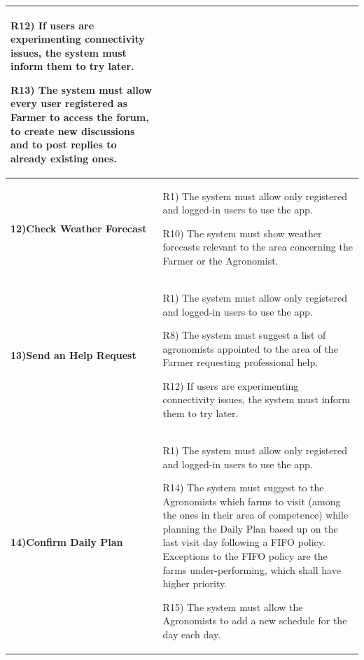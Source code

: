 \documentclass[table, 12pt]{article}
\begin{document}
\begin{itemize}
\begin{longtable}{|p{}|p{}|}
                                                                               R12) If users are experimenting connectivity issues, the system must inform them to try later.
                                                                               
                                                                               R13) The system must allow every user registered as Farmer to access the forum, to create new discussions and to post replies to already existing ones.\\\hline
                    \cellcolor{SpringGreen!50}\textbf{12)Check Weather Forecast}\centering &  R1) The system must allow only registered and logged-in users to use the app.
                    
                                                                                    R10) The system must show weather forecasts relevant to the area concerning the Farmer or the Agronomist.\\\hline
                    \cellcolor{SpringGreen!50}\textbf{13)Send an Help Request}\centering &  R1) The system must allow only registered and logged-in users to use the app.
                    
                                                                                  R8) The system must suggest a list of agronomists appointed to the area of the Farmer requesting professional help.
                                                                                  
                                                                                  R12) If users are experimenting connectivity issues, the system must inform them to try later.\\\hline
                    \cellcolor{SpringGreen!50}\textbf{14)Confirm Daily Plan}\centering &  R1) The system must allow only registered and logged-in users to use the app.
                    
                                                                                          R14) The system must suggest to the Agronomists which farms to visit (among the ones in their area of competence) while planning the Daily Plan based up on the last visit day following a FIFO policy. Exceptions to the FIFO policy are the farms under-performing, which shall have higher priority.

                                                                                          R15) The system must allow the Agronomists to add a new schedule for the day each day.
                                                                                        

\end{longtable}
\end{itemize}
\end{document}
